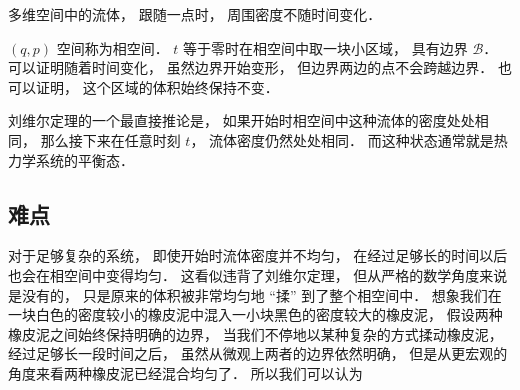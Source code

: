 
多维空间中的流体， 跟随一点时， 周围密度不随时间变化．

$(q, p)$ 空间称为相空间． $t$ 等于零时在相空间中取一块小区域， 具有边界 $\mathcal B$． 可以证明随着时间变化， 虽然边界开始变形， 但边界两边的点不会跨越边界． 也可以证明， 这个区域的体积始终保持不变．

刘维尔定理的一个最直接推论是， 如果开始时相空间中这种流体的密度处处相同， 那么接下来在任意时刻 $t$， 流体密度仍然处处相同． 而这种状态通常就是热力学系统的平衡态．

\subsection{难点}
对于足够复杂的系统， 即使开始时流体密度并不均匀， 在经过足够长的时间以后也会在相空间中变得均匀． 这看似违背了刘维尔定理， 但从严格的数学角度来说是没有的， 只是原来的体积被非常均匀地 “揉” 到了整个相空间中． 想象我们在一块白色的密度较小的橡皮泥中混入一小块黑色的密度较大的橡皮泥， 假设两种橡皮泥之间始终保持明确的边界， 当我们不停地以某种复杂的方式揉动橡皮泥， 经过足够长一段时间之后， 虽然从微观上两者的边界依然明确， 但是从更宏观的角度来看两种橡皮泥已经混合均匀了． 所以我们可以认为
